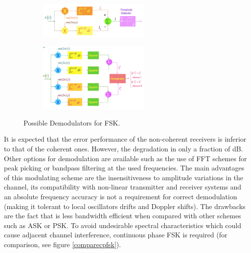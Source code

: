 \documentclass[12pt,a4paper,openright]{article}
\begin{document}
 \begin{figure}[h]
 \centering
\begin{subfigure}[h]{0.9\textwidth}
 \centering
    \includegraphics[width=0.6\textwidth]{fskdem1.pdf}
    \label{coherent}

\end{subfigure}
\quad

\begin{subfigure}[h]{0.9\textwidth}
 \centering
    \includegraphics[width=0.6\textwidth]{fskdem2.pdf}
    \label{noncoherent}
    \end{subfigure}
    \caption{Possible Demodulators for FSK.}
\end{figure}


It is expected that the error performance of the non-coherent receivers is inferior to that of the coherent ones. However, the degradation in only a fraction of dB. Other options for demodulation are available such as the use of FFT schemes for peak picking or bandpass filtering at the used frequencies. 
The main advantages of this modulating scheme are the insensitiveness to amplitude variations in the channel, its compatibility with non-linear transmitter and receiver systems and an absolute frequency accuracy is not a requirement for correct demodulation (making it tolerant to local oscillators drifts and Doppler shifts). The drawbacks are the fact that is less bandwidth efficient when compared with other schemes such as ASK or PSK. To avoid undesirable spectral characteristics which could cause adjacent channel interference, continuous phase FSK is required (for comparison, see figure \ref{comparecpfsk}).
\end{document}
